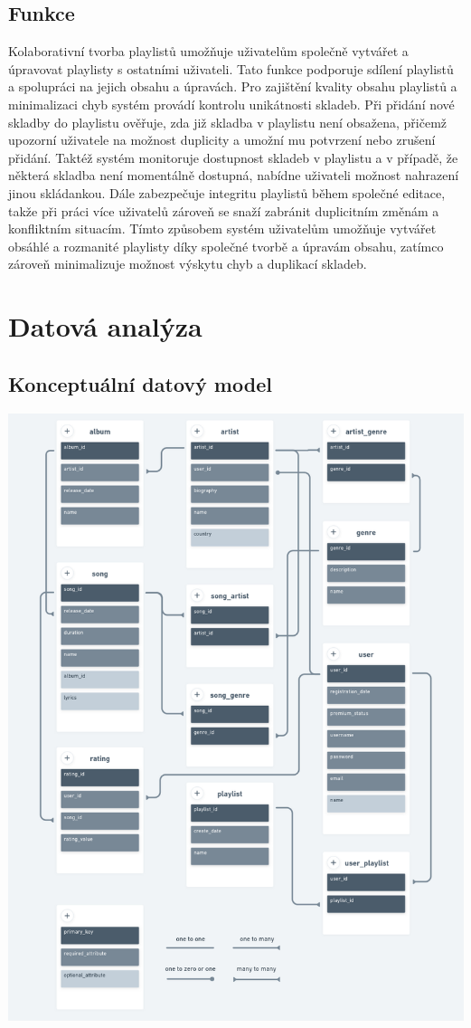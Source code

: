 \documentclass[czech,12pt,a4paper,titlepage]{article}
\begin{document}
    \subsection*{Funkce}
    Kolaborativní tvorba playlistů umožňuje uživatelům společně vytvářet a úpravovat playlisty s ostatními uživateli.
    Tato funkce podporuje sdílení playlistů a spolupráci na jejich obsahu a úpravách.
    Pro zajištění kvality obsahu playlistů a minimalizaci chyb systém provádí kontrolu unikátnosti skladeb.
    Při přidání nové skladby do playlistu ověřuje, zda již skladba v playlistu není obsažena, přičemž upozorní
    uživatele na možnost duplicity a umožní mu potvrzení nebo zrušení přidání.
    Taktéž systém monitoruje dostupnost skladeb v playlistu a v případě, že některá skladba není momentálně dostupná,
    nabídne uživateli možnost nahrazení jinou skládankou.
    Dále zabezpečuje integritu playlistů během společné editace, takže při práci více uživatelů
    zároveň se snaží zabránit duplicitním změnám a konfliktním situacím.
    Tímto způsobem systém uživatelům umožňuje vytvářet obsáhlé a rozmanité playlisty díky společné tvorbě a úpravám obsahu,
    zatímco zároveň minimalizuje možnost výskytu chyb a duplikací skladeb.
    \clearpage


    \section{Datová analýza}\label{sec:datova-analyza}
    \subsection*{Konceptuální datový model}
    \includegraphics[width=0.9 \textwidth, center]{konceptualni_datovy_model}
\end{document}
